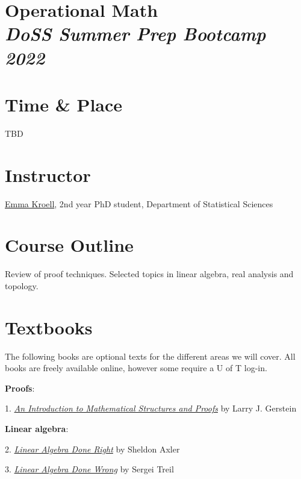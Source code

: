 \documentclass[12pt]{article}
\date{ }
\begin{document}
\section*{Operational Math\\  {\it{DoSS Summer Prep Bootcamp 2022}}}

\section{Time \& Place}
TBD

\section{Instructor}
\href{https://www.emmakroell.ca}{Emma Kroell}, 2nd year PhD student, Department of Statistical Sciences


\section{Course Outline}
Review of proof techniques. Selected topics in linear algebra, real analysis and topology.

\section{Textbooks}
The following books are optional texts for the different areas we will cover. All books are freely available online, however some require a U of T log-in.

\vspace{1em}

\noindent
{\bf{Proofs}}:

1. \href{https://link-springer-com.myaccess.library.utoronto.ca/book/10.1007/978-1-4614-4265-3}{{\emph{An Introduction to Mathematical Structures and Proofs}}} by Larry J. Gerstein

\vspace{1em}

\noindent
{\bf{Linear algebra}}:

\vspace{0.1cm}

2. \href{https://link-springer-com.myaccess.library.utoronto.ca/book/10.1007/978-3-319-11080-6}{{\emph{Linear Algebra Done Right}}} by Sheldon Axler

3. \href{https://www.math.brown.edu/streil/papers/LADW/LADW.html}{{\emph{Linear Algebra Done Wrong}}} by Sergei Treil

\vspace{1em}
\end{document}
